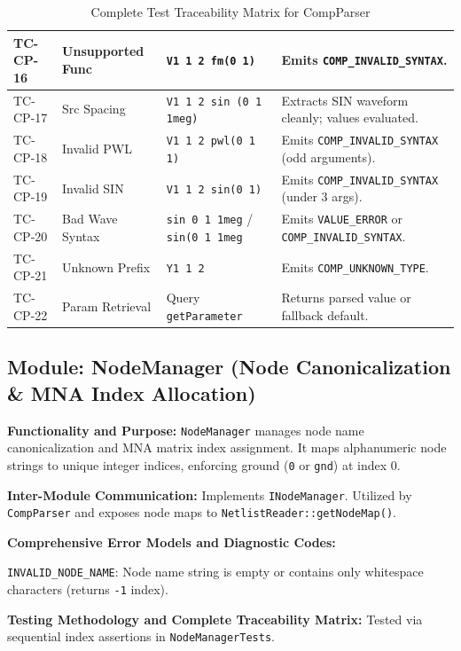 \begin{table}[H]
\begin{tabular}{|l|l|p{4.5cm}|p{4.5cm}|}
\hline
TC-CP-16 & Unsupported Func & \texttt{V1 1 2 fm(0 1)} & Emits \texttt{COMP\_INVALID\_SYNTAX}. \\
\hline
TC-CP-17 & Src Spacing & \texttt{V1 1 2 sin  (0 1 1meg)} & Extracts SIN waveform cleanly; values evaluated. \\
\hline
TC-CP-18 & Invalid PWL & \texttt{V1 1 2 pwl(0 1 1)} & Emits \texttt{COMP\_INVALID\_SYNTAX} (odd arguments). \\
\hline
TC-CP-19 & Invalid SIN & \texttt{V1 1 2 sin(0 1)} & Emits \texttt{COMP\_INVALID\_SYNTAX} (under 3 args). \\
\hline
TC-CP-20 & Bad Wave Syntax & \texttt{sin 0 1 1meg} / \texttt{sin(0 1 1meg} & Emits \texttt{VALUE\_ERROR} or \texttt{COMP\_INVALID\_SYNTAX}. \\
\hline
TC-CP-21 & Unknown Prefix & \texttt{Y1 1 2} & Emits \texttt{COMP\_UNKNOWN\_TYPE}. \\
\hline
TC-CP-22 & Param Retrieval & Query \texttt{getParameter} & Returns parsed value or fallback default. \\
\hline
\end{tabular}
\caption{Complete Test Traceability Matrix for CompParser}
\end{table}


\subsection{Module: NodeManager (Node Canonicalization \& MNA Index Allocation)}

\textbf{Functionality and Purpose:} \texttt{NodeManager} manages node name canonicalization and MNA matrix index assignment. It maps alphanumeric node strings to unique integer indices, enforcing ground (\texttt{0} or \texttt{gnd}) at index 0.

\textbf{Inter-Module Communication:} Implements \texttt{INodeManager}. Utilized by \texttt{CompParser} and exposes node maps to \texttt{NetlistReader::getNodeMap()}.

\textbf{Comprehensive Error Models and Diagnostic Codes:}
\begin{compactitem}
    \item \texttt{INVALID\_NODE\_NAME}: Node name string is empty or contains only whitespace characters (returns \texttt{-1} index).
\end{compactitem}

\textbf{Testing Methodology and Complete Traceability Matrix:} Tested via sequential index assertions in \texttt{NodeManagerTests}.

